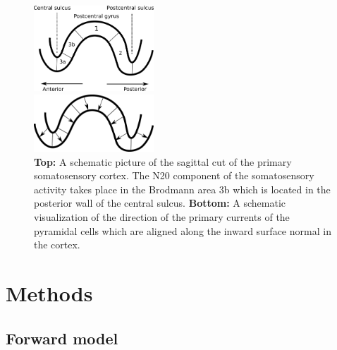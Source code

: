\documentclass[5p]{elsarticle}
\begin{document}
\begin{figure}[h!]
\begin{footnotesize}
\begin{center}
\begin{minipage}{7cm} \begin{center}
\includegraphics[width=4.5cm]{area_3b.png}
\end{center}\end{minipage} \vskip0.2cm
\begin{minipage}{7cm} \begin{center}
\includegraphics[width=4.5cm]{normal_currents.png} 
\end{center}
\end{minipage} 
\end{center}
\end{footnotesize}
\caption{{\bf Top:} A schematic picture of the sagittal cut of the primary somatosensory cortex. The N20 component of the somatosensory activity takes place in the Brodmann area 3b which is located in the posterior wall of the central sulcus. {\bf Bottom:} A schematic visualization of the direction of the primary currents of the pyramidal cells which are aligned along the inward surface normal in the cortex.  }
\label{fig:somatosensory_cortex} 
\end{figure}

\section{Methods}

\subsection{Forward model}
\end{document}
